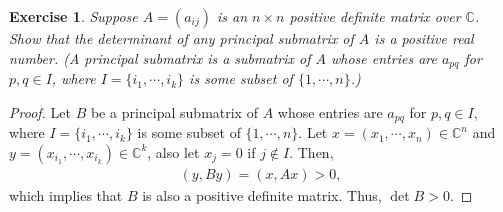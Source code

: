 \documentclass[11pt]{article}
\newtheorem{exercise}{Exercise}[section]
\theoremstyle{definition}
\numberwithin{equation}{subsection}
\begin{document}
\begin{exercise}
Suppose $A = (a_{ij})$ is an $n \times n$ positive definite matrix over $\mathbb{C}$. Show that the determinant of any principal submatrix of $A$ is a positive real number. (A principal submatrix is a submatrix of $A$ whose entries are $a_{pq}$ for $p, q \in I$, where $I = \{i_1, \cdots, i_k\}$ is some subset of $\{1, \cdots, n\}$.)
\end{exercise}
\begin{proof}
Let $B$ be a principal submatrix of $A$ whose entries are $a_{pq}$ for $p, q \in I$, where $I = \{i_1, \cdots, i_k\}$ is some subset of $\{1, \cdots, n\}$. Let $x = (x_1, \cdots, x_n) \in \mathbb{C}^n$ and $y = (x_{i_1}, \cdots, x_{i_k}) \in \mathbb{C}^k$, also let $x_j = 0$ if $j \notin I$. Then,
\begin{align*}
    (y, By) = (x, Ax) > 0,
\end{align*}
which implies that $B$ is also a positive definite matrix. Thus, $\det B > 0$.
\end{proof}

\medskip
\end{document}
